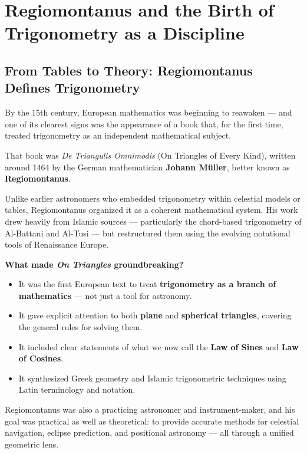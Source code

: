 \section{Regiomontanus and the Birth of Trigonometry as a Discipline}

\subsection{From Tables to Theory: Regiomontanus Defines Trigonometry}

By the 15th century, European mathematics was beginning to reawaken — and one of its clearest signs was the appearance of a book that, for the first time, treated trigonometry as an independent mathematical subject.

That book was \textit{De Triangulis Omnimodis} (On Triangles of Every Kind), written around 1464 by the German mathematician \textbf{Johann Müller}, better known as \textbf{Regiomontanus}.

Unlike earlier astronomers who embedded trigonometry within celestial models or tables, Regiomontanus organized it as a coherent mathematical system. His work drew heavily from Islamic sources — particularly the chord-based trigonometry of Al-Battani and Al-Tusi — but restructured them using the evolving notational tools of Renaissance Europe.

\textbf{What made \textit{On Triangles} groundbreaking?}

\begin{itemize}
  \item It was the first European text to treat \textbf{trigonometry as a branch of mathematics} — not just a tool for astronomy.
  \item It gave explicit attention to both \textbf{plane} and \textbf{spherical triangles}, covering the general rules for solving them.
  \item It included clear statements of what we now call the \textbf{Law of Sines} and \textbf{Law of Cosines}.
  \item It synthesized Greek geometry and Islamic trigonometric techniques using Latin terminology and notation.
\end{itemize}

Regiomontanus was also a practicing astronomer and instrument-maker, and his goal was practical as well as theoretical: to provide accurate methods for celestial navigation, eclipse prediction, and positional astronomy — all through a unified geometric lens.


